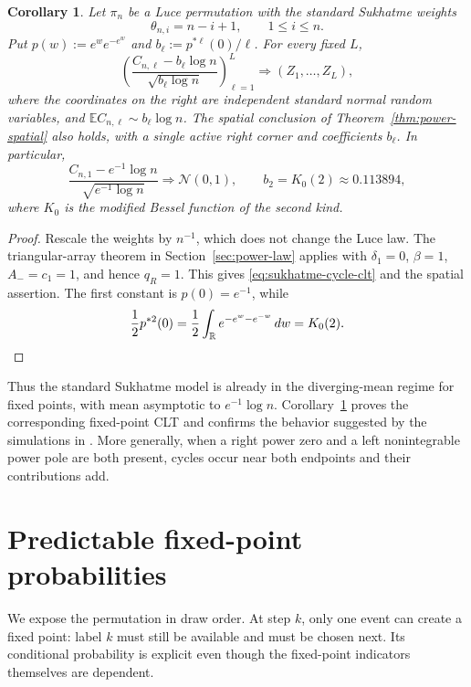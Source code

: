 \documentclass[11pt]{article}
\newtheorem{corollary}[theorem]{Corollary}
\theoremstyle{remark}
\theoremstyle{plain}
\newcommand{\E}{\mathbb E}
\newcommand{\R}{\mathbb R}
\begin{document}
\begin{corollary}\label{cor:sukhatme}
Let $\pi_n$ be a Luce permutation with the standard Sukhatme weights
\[
 \theta_{n,i}=n-i+1,
 \qquad 1\le i\le n.
\]
Put $p(w):=e^we^{-e^w}$ and
$b_\ell:=p^{*\ell}(0)/\ell$.  For every fixed $L$,
\begin{equation}\label{eq:sukhatme-cycle-clt}
 \left(
 \frac{C_{n,\ell}-b_\ell\log n}{\sqrt{b_\ell\log n}}
 \right)_{\ell=1}^L
 \Longrightarrow (Z_1,\ldots,Z_L),
\end{equation}
where the coordinates on the right are independent standard normal random
variables, and $\E C_{n,\ell}\sim b_\ell\log n$.  The spatial conclusion of
Theorem~\ref{thm:power-spatial} also holds, with a single active right corner
and coefficients $b_\ell$.  In particular,
\[
 \frac{C_{n,1}-e^{-1}\log n}{\sqrt{e^{-1}\log n}}
 \Longrightarrow\mathcal N(0,1),
 \qquad
 b_2=K_0(2)\approx0.113894,
\]
where $K_0$ is the modified Bessel function of the second kind.
\end{corollary}

\begin{proof}
Rescale the weights by $n^{-1}$, which does not change the Luce law.  The
triangular-array theorem in Section~\ref{sec:power-law} applies with
$\delta_1=0$, $\beta=1$, $A_-=c_1=1$, and hence $q_R=1$.  This gives
\eqref{eq:sukhatme-cycle-clt} and the spatial assertion.  The first constant
is $p(0)=e^{-1}$, while
\[
 \frac12p^{*2}(0)
 =\frac12\int_{\R}e^{-e^w-e^{-w}}\,dw=K_0(2).\qedhere
\]
\end{proof}

Thus the standard Sukhatme model is already in the diverging-mean regime for
fixed points, with mean asymptotic to $e^{-1}\log n$.
Corollary~\ref{cor:sukhatme} proves the corresponding fixed-point CLT and
confirms the behavior suggested by the simulations in
\cite[Section~5.2]{borga2025permutonlocallimitsluce}.  More generally, when a
right power zero and a left nonintegrable power pole are both present, cycles
occur near both endpoints and their contributions add.

\section{Predictable fixed-point probabilities}

We expose the permutation in draw order.  At step $k$, only one event can
create a fixed point: label $k$ must still be available and must be chosen
next.  Its conditional probability is explicit even though the fixed-point
indicators themselves are dependent.
\end{document}
